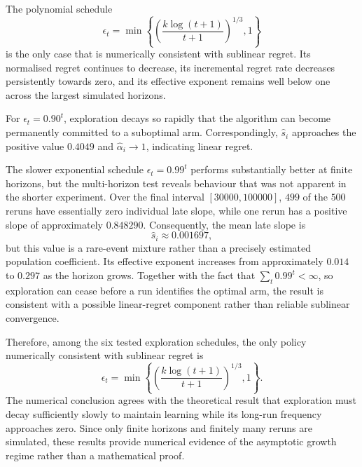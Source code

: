 The polynomial schedule
\[
    \epsilon_t=
    \min\left\{
        \left(
            \frac{k\log(t+1)}{t+1}
        \right)^{1/3},
        1
    \right\}
\]
is the only case that is numerically consistent with sublinear regret.
Its normalised regret continues to decrease, its incremental regret rate
decreases persistently towards zero, and its effective exponent remains
well below one across the largest simulated horizons.

For $\epsilon_t=0.90^t$, exploration decays so rapidly that the algorithm can
become permanently committed to a suboptimal arm. Correspondingly,
$\widehat{s}_i$ approaches the positive value $0.4049$ and
$\widehat{\alpha}_i\to1$, indicating linear regret.

The slower exponential schedule $\epsilon_t=0.99^t$ performs substantially
better at finite horizons, but the multi-horizon test reveals behaviour that
was not apparent in the shorter experiment. Over the final interval
$[30000,100000]$, $499$ of the $500$ reruns have essentially zero individual
late slope, while one rerun has a positive slope of approximately $0.848290$.
Consequently, the mean late slope is
\[
    \widehat{s}_i\approx0.001697,
\]
but this value is a rare-event mixture rather than a precisely estimated
population coefficient. Its effective exponent increases from approximately
$0.014$ to $0.297$ as the horizon grows. Together with the fact that
$\sum_t 0.99^t<\infty$, so exploration can cease before a run identifies the
optimal arm, the result is consistent with a possible linear-regret
component rather than reliable sublinear convergence.

Therefore, among the six tested exploration schedules, the only policy
numerically consistent with sublinear regret is
\[
    \epsilon_t=
    \min\left\{
        \left(
            \frac{k\log(t+1)}{t+1}
        \right)^{1/3},
        1
    \right\}.
\]
The numerical conclusion agrees with the theoretical result that exploration
must decay sufficiently slowly to maintain learning while its long-run
frequency approaches zero. Since only finite horizons and finitely many
reruns are simulated, these results provide numerical evidence of the
asymptotic growth regime rather than a mathematical proof.

